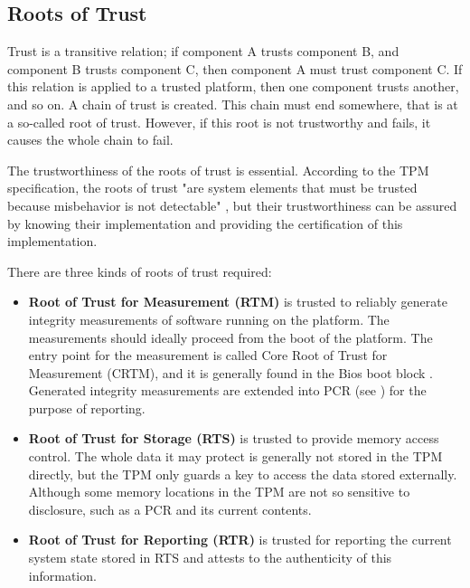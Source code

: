 \subsection{Roots of Trust}
Trust is a transitive relation; if component A trusts component B, and component B trusts component C, then component A must trust component C. If this relation is applied to a trusted platform, then one component trusts another, and so on. A chain of trust is created. This chain must end somewhere, that is at a so-called root of trust. However, if this root is not trustworthy and fails, it causes the whole chain to fail.

The trustworthiness of the roots of trust is essential. According to the TPM specification, the roots of trust "are system elements that must be trusted because misbehavior is not detectable" \cite[p.~23]{tcg_p1_architecture}, but their trustworthiness can be assured by knowing their implementation and providing the certification of this implementation.

There are three kinds of roots of trust required:
\begin{itemize}
    \item \textbf{Root of Trust for Measurement (RTM)} is trusted to reliably generate integrity measurements of software running on the platform. The measurements should ideally proceed from the boot of the platform. The entry point for the measurement is called Core Root of Trust for Measurement (CRTM), and it is generally found in the Bios boot block \cite[p.~185]{Tomlinson2017}. Generated integrity measurements are extended into PCR (see ) for the purpose of reporting.
    \item \textbf{Root of Trust for Storage (RTS)} is trusted to provide memory access control. The whole data it may protect is generally not stored in the TPM directly, but the TPM only guards a key to access the data stored externally. Although some memory locations in the TPM are not so sensitive to disclosure, such as a PCR and its current contents. 
    \item \textbf{Root of Trust for Reporting (RTR)} is trusted for reporting the current system state stored in RTS and attests to the authenticity of this information.
\end{itemize}

